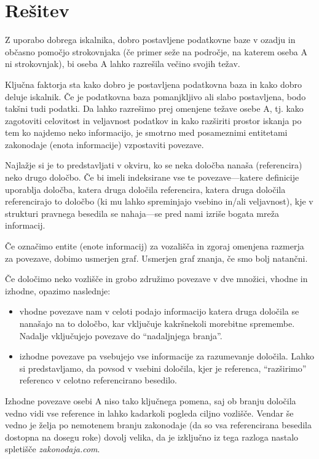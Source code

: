 \documentclass[a4paper,12pt,openright]{book}
\begin{document}
\section{Rešitev}

Z uporabo dobrega iskalnika, dobro postavljene podatkovne baze v ozadju in občasno pomočjo strokovnjaka (če primer seže na področje, na katerem oseba A ni strokovnjak), bi oseba A lahko razrešila večino svojih težav.

Ključna faktorja sta kako dobro je postavljena podatkovna baza in kako dobro deluje iskalnik. Če je podatkovna baza pomanjkljivo ali slabo postavljena, bodo takšni tudi podatki. Da lahko razrešimo prej omenjene težave osebe A, tj. kako zagotoviti celovitost in veljavnost podatkov in kako razširiti prostor iskanja po tem ko najdemo neko informacijo, je smotrno med posameznimi entitetami zakonodaje (enota informacije) vzpostaviti povezave.

Najlažje si je to predstavljati v okviru, ko se neka določba nanaša (referencira) neko drugo določbo. Če bi imeli indeksirane vse te povezave—katere definicije uporablja določba, katera druga določila referencira, katera druga določila referencirajo to določbo (ki mu lahko spreminjajo vsebino in/ali veljavnost), kje v strukturi pravnega besedila se nahaja—se pred nami izriše bogata mreža informacij.

Če označimo entite (enote informacij) za vozališča in zgoraj omenjena razmerja za povezave, dobimo usmerjen graf. Usmerjen graf znanja, če smo bolj natančni.

Če določimo neko vozlišče in grobo združimo povezave v dve množici, vhodne in izhodne, opazimo naslednje:
\begin{itemize}
    \item vhodne povezave nam v celoti podajo informacijo katera druga določila se nanašajo na to določbo, kar vključuje kakršnekoli morebitne spremembe. Nadalje vključujejo povezave do “nadaljnjega branja”.
    \item izhodne povezave pa vsebujejo vse informacije za razumevanje določila. Lahko si predstavljamo, da povsod v vsebini določila, kjer je referenca, “razširimo” referenco v celotno referencirano besedilo.
\end{itemize}

Izhodne povezave osebi A niso tako ključnega pomena, saj ob branju določila vedno vidi vse reference in lahko kadarkoli pogleda ciljno vozlišče. Vendar še vedno je želja po nemotenem branju zakonodaje (da so vsa referencirana besedila dostopna na dosegu roke) dovolj velika, da je izključno iz tega razloga nastalo spletišče \textit{zakonodaja.com}.
\end{document}
